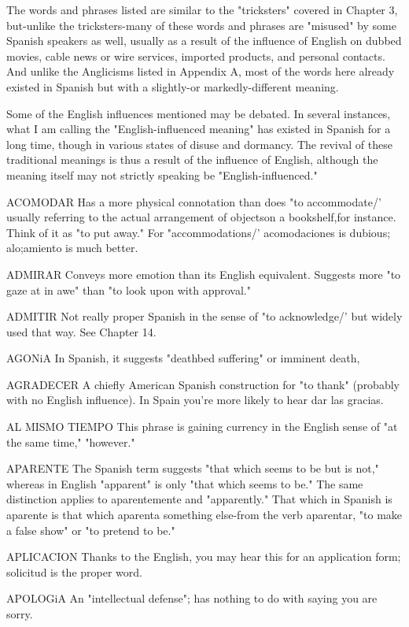 The words and phrases listed are similar to the "tricksters"
covered in Chapter 3, but-unlike the tricksters-many of these words
and phrases are "misused" by some Spanish speakers as well, usually
as a result of the influence of English on dubbed movies, cable news
or wire services, imported products, and personal contacts. And unlike the Anglicisms listed in Appendix A, most of the words here already
existed in Spanish but with a slightly-or markedly-different meaning.

Some of the English influences mentioned may be debated. In
several instances, what I am calling the "English-influenced meaning"
has existed in Spanish for a long time, though in various states of disuse and dormancy. The revival of these traditional meanings is thus a
result of the influence of English, although the meaning itself may not
strictly speaking be "English-influenced."

\bsk

ACOMODAR Has a more physical connotation than does "to
accommodate/' usually referring to the actual arrangement of objectson a bookshelf,for instance. Think of it as "to put away." For "accommodations/' acomodaciones is dubious; alo;amiento is much better.

ADMIRAR Conveys more emotion than its English equivalent.
Suggests more "to gaze at in awe" than "to look upon with approval."

ADMITIR Not really proper Spanish in the sense of "to acknowledge/' but widely used that way. See Chapter 14.

AGONiA In Spanish, it suggests "deathbed suffering" or imminent death,

AGRADECER A chiefly American Spanish construction for
"to thank" (probably with no English influence). In Spain you're more
likely to hear dar las gracias.

AL MISMO TIEMPO This phrase is gaining currency in the English sense of "at the same time," "however."

APARENTE The Spanish term suggests "that which seems
to be but is not," whereas in English "apparent" is only "that which
seems to be." The same distinction applies to aparentemente and "apparently." That which in Spanish is aparente is that which aparenta
something else-from the verb aparentar, "to make a false show" or
"to pretend to be."

APLICACION Thanks to the English, you may hear this for an
application form; solicitud is the proper word.

APOLOGiA An "intellectual defense"; has nothing to do with
saying you are sorry.

